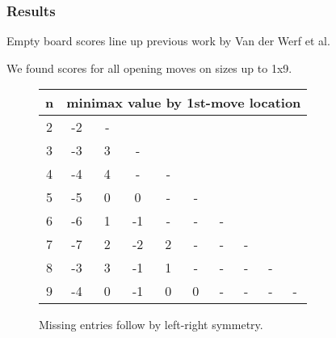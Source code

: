 \documentclass{beamer}
\begin{document}
    \begin{frame}
        \frametitle{Results}
        Empty board scores line up previous work by Van der Werf et al.

        We found scores for all opening moves on sizes up to 1x9.

        \begin{figure}[th]
        \begin{tabular}{|c|ccccccccc|} \hline
        n & \multicolumn{9}{c|}{minimax value by 1st-move location} \\ \hline
        2 & -2 & - &&&&&&& \\
        3 & -3 & 3 & - &&&&&& \\
        4 & -4 & 4 & - & - &&&&& \\
        5 & -5 & 0 & 0 & - & - &&&& \\
        6 & -6 & 1 & -1 & - & - & - &&&\\
        7 & -7 &  2 & -2 & 2 & - & - & - &&\\
        8 & -3 &  3 & -1 & 1 & - & - & - & - &\\
        9 & -4 & 0  & -1  & 0 & 0 & - & - & - & -\\ \hline
        \end{tabular}
        \caption{Missing entries follow by left-right symmetry.}\label{fig:1st_move_value}
        \label{fig:mmx}
        \end{figure}
    \end{frame}
\end{document}
